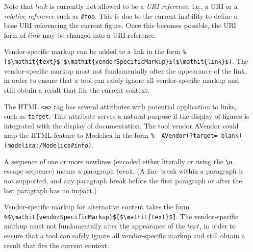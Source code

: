 \begin{nonnormative}
Note that $\mathit{link}$ is currently not allowed to be a \emph{URI reference}, i.e., a URI or a \emph{relative reference} such as \lstinline!#foo!.
This is due to the current inability to define a base URI referencing the current figure.
Once this becomes possible, the URI form of $\mathit{link}$ may be changed into a URI reference.
\end{nonnormative}

Vendor-specific markup can be added to a link in the form \lstinline!%[$\mathit{text}$]$\mathit{vendorSpecificMarkup}$($\mathit{link}$)!.
The vendor-specific markup must not fundamentally alter the appearance of the link, in order to ensure that a tool can safely ignore all vendor-specific markup and still obtain a result that fits the current context.

\begin{example}
The HTML \lstinline!<a>! tag has several attributes with potential application to links, such as \lstinline!target!.
This attribute serves a natural purpose if the display of figures is integrated with the display of documentation.
The tool vendor AVendor could map the HTML feature to Modelica in the form \lstinline!%__AVendor(?target=_blank)(modelica:/Modelica#info)!.
\end{example}

A sequence of one or more newlines (encoded either literally or using the \lstinline!\n! escape sequence) means a paragraph break.
(A line break within a paragraph is not supported, and any paragraph break before the first paragraph or after the last paragraph has no impact.)

Vendor-specific markup for alternative content takes the form \lstinline!%$\mathit{vendorSpecificMarkup}$[$\mathit{text}$]!.
The vendor-specific markup must not fundamentally alter the appearance of the $\mathit{text}$, in order to ensure that a tool can safely ignore all vendor-specific markup and still obtain a result that fits the current context.

